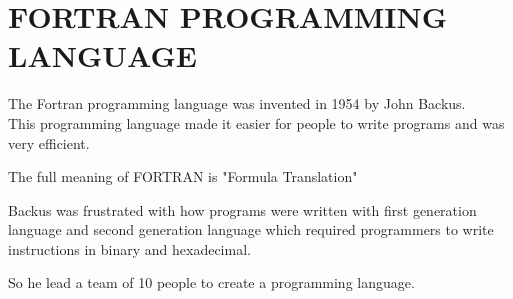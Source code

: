 \documentclass{article}
\begin{document}
	\section*{FORTRAN PROGRAMMING LANGUAGE}
	The Fortran programming language was invented in 1954 by John Backus.\\
	This programming language made it easier for people to write programs and was very efficient.
	
	The full meaning of FORTRAN is "Formula Translation"
	
	Backus was frustrated with how programs were written with first generation language and second generation language which required programmers to write instructions in binary and hexadecimal.
	
	So he lead a team of 10 people to create a programming language.
	  
\end{document}
